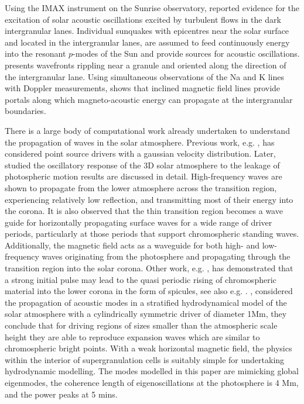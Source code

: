 \documentclass[preprint,authoryear,12pt]{elsarticle}
\begin{document}
Using the IMAX instrument on the Sunrise observatory, \citet{Roth2010}  reported evidence for the excitation of solar acoustic oscillations excited by turbulent flows  in the dark intergranular lanes.  Individual sunquakes with epicentres near the solar surface and located in the intergranular lanes, are assumed to feed continuously energy into the resonant $p$-modes of the Sun and provide sources for acoustic oscillations. \citet{Roth2010} presents wavefronts rippling near a granule and oriented along the direction of the intergranular lane. Using simultaneous observations of the Na and K lines with Doppler measurements, \citet{Jefferies2006} shows that inclined magnetic field lines provide portals along which magneto-acoustic energy can propagate at the intergranular boundaries.

There is a large body of computational work already undertaken to understand the propagation of waves in the solar atmosphere. Previous work, e.g. \citet{Erdelyi2007}, has considered point source drivers with a gaussian velocity distribution. Later, \citet{Fedun2009} studied the oscillatory response of the 3D solar atmosphere to the leakage of photospheric motion results are discussed in detail. High-frequency waves are shown to propagate from the lower atmosphere across the transition region, experiencing relatively low reflection, and transmitting most of their energy into the corona. It is also observed that the thin transition region becomes a wave guide for horizontally propagating surface waves for a wide range of driver periods, particularly at those periods that support chromospheric standing waves. Additionally, the magnetic field acts as a waveguide for both high- and low-frequency waves originating from the photosphere and propagating through the transition region into the solar corona.  Other work, e.g.  \citet{Murawski2010}, has demonstrated that a strong initial pulse may lead to the quasi periodic rising of chromospheric material into the lower corona in the form of spicules, see also e.g. \citet{Khomenko2013}. \citet{Kalkofen2010}, considered the propagation of acoustic modes in a stratified hydrodynamical model of the solar atmosphere with a cylindrically symmetric driver of diameter 1Mm, they conclude that for driving regions of sizes smaller than the atmospheric scale height they are able to reproduce expansion waves which are similar to chromospheric bright points. With a weak horizontal magnetic field, the physics within the interior of supergranulation cells \citet{Lites2008} is suitably simple for undertaking hydrodynamic modelling. The modes modelled in this paper are mimicking global eigenmodes, the coherence length of eigenoscillations at the photosphere is 4 Mm, and the power peaks at 5 mins. 
\end{document}
